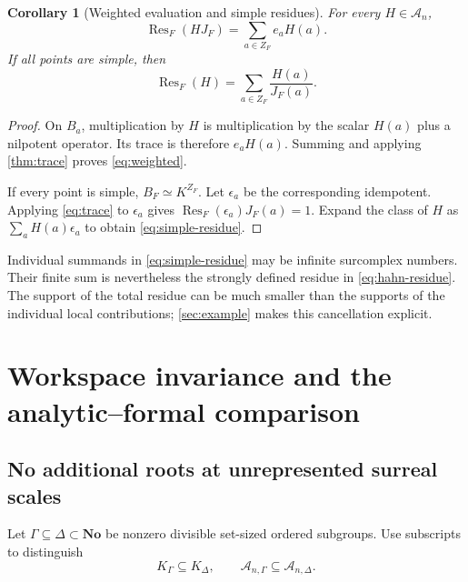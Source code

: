 \documentclass[11pt,letterpaper]{article}
\newtheorem{corollary}[corollary]{Corollary}
\theoremstyle{definition}
\theoremstyle{remark}
\newcommand{\No}{\mathbf{No}}
\newcommand{\A}{\mathscr A}
\newcommand{\Res}{\operatorname{Res}}
\numberwithin{equation}{section}
\begin{document}
\begin{corollary}[Weighted evaluation and simple residues]\label{cor:weighted}
For every $H\in\A_n$,
\begin{equation}\label{eq:weighted}
 \Res_F(HJ_F)=\sum_{a\in Z_F}e_aH(a).
\end{equation}
If all points are simple, then
\begin{equation}\label{eq:simple-residue}
 \Res_F(H)=\sum_{a\in Z_F}\frac{H(a)}{J_F(a)}.
\end{equation}
\end{corollary}
\begin{proof}
On $B_a$, multiplication by $H$ is multiplication by the scalar $H(a)$ plus a nilpotent operator. Its trace is therefore $e_aH(a)$. Summing and applying \cref{thm:trace} proves \eqref{eq:weighted}.

If every point is simple, $B_F\simeq K^{Z_F}$. Let $\epsilon_a$ be the corresponding idempotent. Applying \eqref{eq:trace} to $\epsilon_a$ gives $\Res_F(\epsilon_a)J_F(a)=1$. Expand the class of $H$ as $\sum_aH(a)\epsilon_a$ to obtain \eqref{eq:simple-residue}.
\end{proof}

Individual summands in \eqref{eq:simple-residue} may be infinite surcomplex numbers. Their finite sum is nevertheless the strongly defined residue in \eqref{eq:hahn-residue}. The support of the total residue can be much smaller than the supports of the individual local contributions; \cref{sec:example} makes this cancellation explicit.

\section{Workspace invariance and the analytic--formal comparison}\label{sec:extension}

\subsection{No additional roots at unrepresented surreal scales}
Let $\Gamma\subseteq\Delta\subset\No$ be nonzero divisible set-sized ordered subgroups. Use subscripts to distinguish
\[
 K_\Gamma\subseteq K_\Delta,\qquad
 \A_{n,\Gamma}\subseteq\A_{n,\Delta}.
\]
\end{document}
